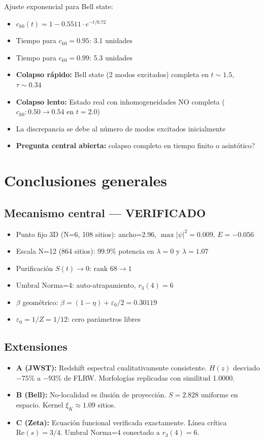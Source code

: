 \documentclass[12pt]{article}
\begin{document}
Ajuste exponencial para Bell state:
\begin{itemize}
  \item $c_{k0}(t) = 1 - 0.5511 \cdot e^{-t/0.72}$
  \item Tiempo para $c_{k0}=0.95$: 3.1 unidades
  \item Tiempo para $c_{k0}=0.99$: 5.3 unidades
\end{itemize}

\begin{itemize}
  \item \textbf{Colapso r\'apido:} Bell state (2 modos excitados) completa en $t\sim 1.5$, $\tau\sim 0.34$
  \item \textbf{Colapso lento:} Estado real con inhomogeneidades NO completa ($c_{k0}: 0.50\to 0.54$ en $t=2.0$)
  \item La discrepancia se debe al n\'umero de modos excitados inicialmente
  \item \textbf{Pregunta central abierta:} colapso completo en tiempo finito o asint\'otico?
\end{itemize}

\section{Conclusiones generales}

\subsection{Mecanismo central --- VERIFICADO}
\begin{itemize}
  \item Punto fijo 3D (N=6, 108 sitios): ancho=2.96, $\max|\psi|^2=0.009$, $E=-0.056$ \checkmark
  \item Escala N=12 (864 sitios): 99.9\% potencia en $\lambda=0$ y $\lambda=1.07$ \checkmark
  \item Purificaci\'on $S(t)\to 0$: rank $68\to 1$ \checkmark
  \item Umbral Norma=4: auto-atrapamiento, $r_3(4)=6$ \checkmark
  \item $\beta$ geom\'etrico: $\beta = (1-\eta) + \varepsilon_0/2 = 0.30119$ \checkmark
  \item $\varepsilon_0 = 1/Z = 1/12$: cero par\'ametros libres \checkmark
\end{itemize}

\subsection{Extensiones}
\begin{itemize}
  \item \textbf{A (JWST):} Redshift espectral cualitativamente consistente. $H(z)$ desviado $-75\%$ a $-93\%$ de FLRW. Morfolog\'ias replicadas con similitud 1.0000.
  \item \textbf{B (Bell):} No-localidad es ilusi\'on de proyecci\'on. $S=2.828$ uniforme en espacio. Kernel $\xi_K\approx 1.09$ sitios.
  \item \textbf{C (Zeta):} Ecuaci\'on funcional verificada exactamente. L\'inea cr\'itica $\text{Re}(s)=3/4$. Umbral Norma=4 conectado a $r_3(4)=6$.
\end{itemize}
\end{document}
